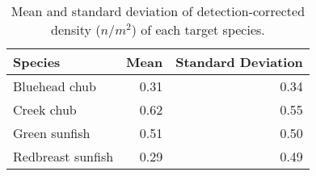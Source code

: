 \begin{table}[ht]
\centering
\caption{Mean and standard deviation of detection-corrected density ($n /m^2$) of each target species.} 
\label{tab:density}
\begin{tabular}{lrr}
  \hline
Species & Mean & Standard Deviation \\ 
  \hline
Bluehead chub & 0.31 & 0.34 \\ 
  Creek chub & 0.62 & 0.55 \\ 
  Green sunfish & 0.51 & 0.50 \\ 
  Redbreast sunfish & 0.29 & 0.49 \\ 
   \hline
\end{tabular}
\end{table}
